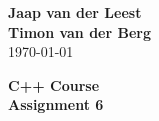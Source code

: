 \documentclass{article}[9pt]
\begin{document}
\begin{flushright}
	\textbf{Jaap van der Leest\\ Timon van der Berg \\ }
\today
\end{flushright}

\begin{center}
\textbf{C++ Course \\
Assignment 6} \\
\end{center}

\tableofcontents

\end{document}
